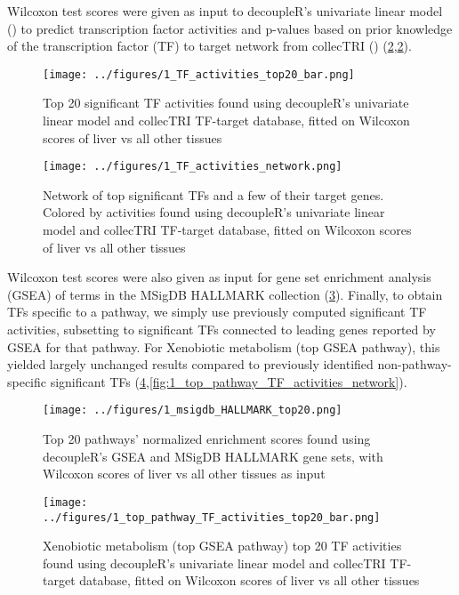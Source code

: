 \documentclass{article}
\begin{document}
Wilcoxon test scores were given as input to decoupleR's univariate linear model (\cite{Badia-I-Mompel2022-wj}) to predict transcription factor activities and p-values based on prior knowledge of the transcription factor (TF) to target network from collecTRI (\cite{Muller-Dott2023-ve}) (\ref{fig:1_TF_activities_top20_bar},\ref{fig:1_TF_activities_top20_bar}).

\begin{figure}[htbp]
  \centering
  \texttt{[image: ../figures/1\_TF\_activities\_top20\_bar.png]}
  \caption{Top 20 significant TF activities found using decoupleR's univariate linear model and collecTRI TF-target database, fitted on Wilcoxon scores of liver vs all other tissues}
  \label{fig:1_TF_activities_top20_bar}
\end{figure}

\begin{figure}[htbp]
  \centering
  \texttt{[image: ../figures/1\_TF\_activities\_network.png]}
  \caption{Network of top significant TFs and a few of their target genes. Colored by activities found using decoupleR's univariate linear model and collecTRI TF-target database, fitted on Wilcoxon scores of liver vs all other tissues}
  \label{fig:1_TF_activities_top20_bar}
\end{figure}
\FloatBarrier

Wilcoxon test scores were also given as input for gene set enrichment analysis (GSEA) of terms in the MSigDB HALLMARK collection (\ref{fig:1_msigdb_HALLMARK_top20}). Finally, to obtain TFs specific to a pathway, we simply use previously computed significant TF activities, subsetting to significant TFs connected to leading genes reported by GSEA for that pathway. For Xenobiotic metabolism (top GSEA pathway), this yielded largely unchanged results compared to previously identified non-pathway-specific significant TFs (\ref{fig:1_top_pathway_TF_activities_top20_bar},\ref{fig:1_top_pathway_TF_activities_network}). 

\begin{figure}[htbp]
  \centering
  \texttt{[image: ../figures/1\_msigdb\_HALLMARK\_top20.png]}
  \caption{Top 20 pathways' normalized enrichment scores found using decoupleR's GSEA and MSigDB HALLMARK gene sets, with Wilcoxon scores of liver vs all other tissues as input}
  \label{fig:1_msigdb_HALLMARK_top20}
\end{figure}

\begin{figure}[htbp]
  \centering
  \texttt{[image: ../figures/1\_top\_pathway\_TF\_activities\_top20\_bar.png]}
  \caption{Xenobiotic metabolism (top GSEA pathway) top 20 TF activities found using decoupleR's univariate linear model and collecTRI TF-target database, fitted on Wilcoxon scores of liver vs all other tissues}
  \label{fig:1_top_pathway_TF_activities_top20_bar}
\end{figure}
\end{document}
